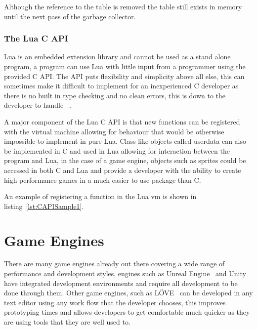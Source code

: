 \documentclass[11pt,a4paper,titlepage]{article}
\begin{document}
			Although the reference to the table is removed the table still exists in memory until the next pass of the garbage collector.

		\subsubsection{The Lua C API}

			Lua is an embedded extension library and cannot be used as a stand alone program, a program can use Lua with little input from a programmer using the provided C API. The API puts flexibility and simplicity above all else, this can sometimes make it difficult to implement for an inexperienced C developer as there is no built in type checking and no clean errors, this is down to the developer to handle ~\cite{Ierusalimschy:2013:PLT:2502646}.

			A major component of the Lua C API is that new functions can be registered with the virtual machine allowing for behaviour that would be otherwise impossible to implement in pure Lua. Class like objects called userdata can also be implemented in C and used in Lua allowing for interaction between the program and Lua, in the case of a game engine, objects such as sprites could be accessed in both C and Lua and provide a developer with the ability to create high performance games in a much easier to use package than C.

			An example of registering a function in the Lua vm is shown in listing~\ref{lst:CAPISample1}.
			

	\newpage

	\section{Game Engines}
		
		There are many game engines already out there covering a wide range of performance and development styles, engines such as Unreal Engine~\cite{UE} and Unity~\cite{Unity} have integrated development environments and require all development to be done through them. Other game engines, such as LÖVE~\cite{LOVE} can be developed in any text editor using any work flow that the developer chooses, this improves prototyping times and allows developers to get comfortable much quicker as they are using tools that they are well used to.
\end{document}
